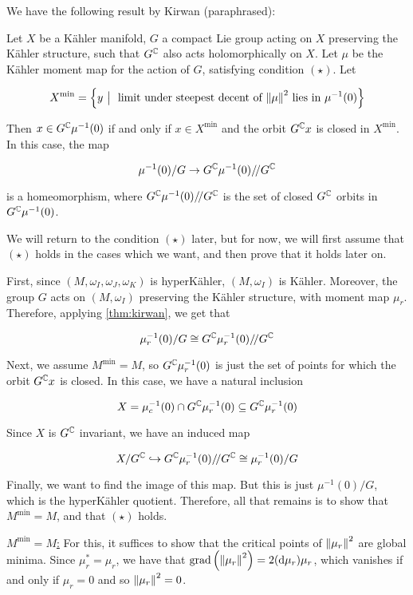 \documentclass{article}
\newcommand{\sslash}{/\!/}
\DeclareMathOperator{\gr}{grad}
\begin{document}
We have the following result by Kirwan (paraphrased):

\begin{theorem}
    \label{thm:kirwan}
    Let \(X\) be a K\"ahler manifold, \(G\) a compact Lie group acting on \(X\) preserving the K\"ahler structure, such that \(G^{\mathbb{C}}\) also acts holomorphically on \(X\). Let \(\mu\) be the K\"ahler moment map for the action of \(G\), satisfying condition \((\star)\). Let

    \[X^{\min} = \left\{y\ \big\vert\ \text{ limit under steepest decent of }\norm{\mu}^2\text{ lies in }\mu^{-1}(0)\right\}\]

    Then \(x \in G^{\mathbb{C}}\mu^{-1}(0)\) if and only if \(x \in X^{\min}\) and the orbit \(G^{\mathbb{C}} x\) is closed in \(X^{\min}\). In this case, the map

    \[\mu^{-1}(0)/G \to G^\C\mu^{-1}(0)\sslash G^\C\]

    is a homeomorphism, where \(G^\C\mu^{-1}(0)\sslash G^\C\) is the set of closed \(G^{\mathbb{C}}\) orbits in \(G^{\mathbb{C}} \mu^{-1}(0)\).
\end{theorem}

We will return to the condition \((\star)\) later, but for now, we will first assume that \((\star)\) holds in the cases which we want, and then prove that it holds later on.

First, since \((M, \omega_I, \omega_J, \omega_K)\) is hyperK\"ahler, \((M, \omega_I)\) is K\"ahler. Moreover, the group \(G\) acts on \((M, \omega_I)\) preserving the K\"ahler structure, with moment map \(\mu_r\). Therefore, applying \cref{thm:kirwan}, we get that

\[\mu_r^{-1}(0)/G \cong G^\C \mu_r^{-1}(0)\sslash G^\C\]

Next, we assume \(M^{\min} = M\), so \(G^{\mathbb{C}}\mu_r^{-1}(0)\) is just the set of points for which the orbit \(G^{\mathbb{C}} x\) is closed. In this case, we have a natural inclusion

\[X = \mu_c^{-1}(0) \cap G^{\mathbb{C}} \mu_r^{-1}(0) \subseteq G^{\mathbb{C}}\mu_r^{-1}(0)\]

Since \(X\) is \(G^{\mathbb{C}}\) invariant, we have an induced map

\[X/G^\C \hookrightarrow G^\C\mu_r^{-1}(0)\sslash G^\C \cong \mu_r^{-1}(0)/G\]

Finally, we want to find the image of this map. But this is just \(\mu^{-1}(0)/G\), which is the hyperK\"ahler quotient. Therefore, all that remains is to show that \(M^{\min} = M\), and that \((\star)\) holds.

\underline{\(M^{\min} = M\):} For this, it suffices to show that the critical points of \(\norm{\mu_r}^2\) are global minima. Since \(\mu_r^* = \mu_r\), we have that \(\gr\left(\norm{\mu_r}^2\right) = 2(\dd\mu_r)\mu_r\), which vanishes if and only if \(\mu_r = 0\) and so \(\norm{\mu_r}^2 = 0\).
\end{document}
